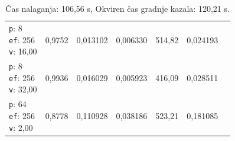 \begin{table}[htbp]
\begin{tabularx}{\textwidth}{Xrrrrrr}
    \makecell{\texttt{p}: 8\\\texttt{ef}: 256\\\texttt{v}: 16,00} & 0,9752 & 0,013102 & 0,006330 & 514,82 & 0,024193 \\
    \makecell{\texttt{p}: 8\\\texttt{ef}: 256\\\texttt{v}: 32,00} & 0,9936 & 0,016029 & 0,005923 & 416,09 & 0,028511 \\
    \makecell{\texttt{p}: 64\\\texttt{ef}: 256\\\texttt{v}: 2,00} & 0,8778 & 0,110928 & 0,038186 & 523,21 & 0,181085 \\
    \bottomrule
  \end{tabularx}
\caption* {Čas nalaganja: 106,56 s, Okviren čas gradnje kazala: 120,21 s.}\end{table}



